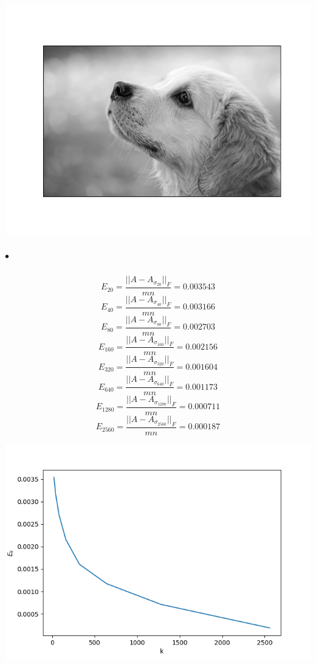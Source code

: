 \documentclass[12pt]{article}
\begin{document}
		\includegraphics[scale=0.8]{part1/prob_a/Figure_9} \\

	\subparagraph{$\bullet$}	
		\[
		E_{20} = \frac{||A - A_{\sigma_{20}}||_F}{mn} = 0.003543
		\]\[
		E_{40} = \frac{||A - A_{\sigma_{40}}||_F}{mn} = 0.003166
		\]\[
		E_{80} = \frac{||A - A_{\sigma_{80}}||_F}{mn} = 0.002703
		\]\[
		E_{160} = \frac{||A - A_{\sigma_{160}}||_F}{mn} = 0.002156
		\]\[
		E_{320} = \frac{||A - A_{\sigma_{320}}||_F}{mn} = 0.001604
		\]\[
		E_{640} = \frac{||A - A_{\sigma_{640}}||_F}{mn} = 0.001173
		\]\[
		E_{1280} = \frac{||A - A_{\sigma_{1280}}||_F}{mn} = 0.000711
		\]\[
		E_{2560} = \frac{||A - A_{\sigma_{2560}}||_F}{mn} = 0.000187
		\]
		
		\includegraphics{part1/prob_a/Figure_10}
		
\end{document}
